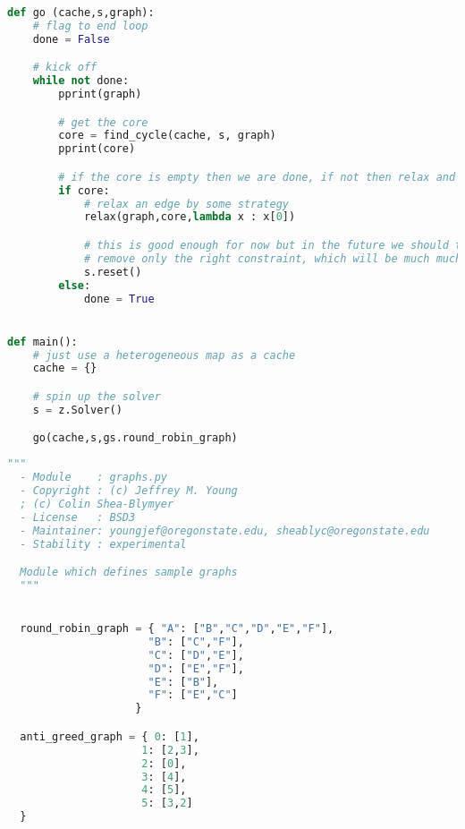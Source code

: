 \begin{lstlisting}[language=python]
def go (cache,s,graph):
    # flag to end loop
    done = False

    # kick off
    while not done:
        pprint(graph)

        # get the core
        core = find_cycle(cache, s, graph)
        pprint(core)

        # if the core is empty then we are done, if not then relax and recur
        if core:
            # relax an edge by some strategy
            relax(graph,core,lambda x : x[0])

            # this is good enough for now but in the future we should try to
            # remove only the right constraint, which will be much much faster
            s.reset()
        else:
            done = True


def main():
    # just use a heterogeneous map as a cache
    cache = {}

    # spin up the solver
    s = z.Solver()

    go(cache,s,gs.round_robin_graph)
\end{lstlisting}

\newpage
\begin{lstlisting}[language=python]
  """
  - Module    : graphs.py
  - Copyright : (c) Jeffrey M. Young
  ; (c) Colin Shea-Blymyer
  - License   : BSD3
  - Maintainer: youngjef@oregonstate.edu, sheablyc@oregonstate.edu
  - Stability : experimental

  Module which defines sample graphs
  """


  round_robin_graph = { "A": ["B","C","D","E","F"],
                      "B": ["C","F"],
                      "C": ["D","E"],
                      "D": ["E","F"],
                      "E": ["B"],
                      "F": ["E","C"]
                    }

  anti_greed_graph = { 0: [1],
                     1: [2,3],
                     2: [0],
                     3: [4],
                     4: [5],
                     5: [3,2]
  }
\end{lstlisting}

